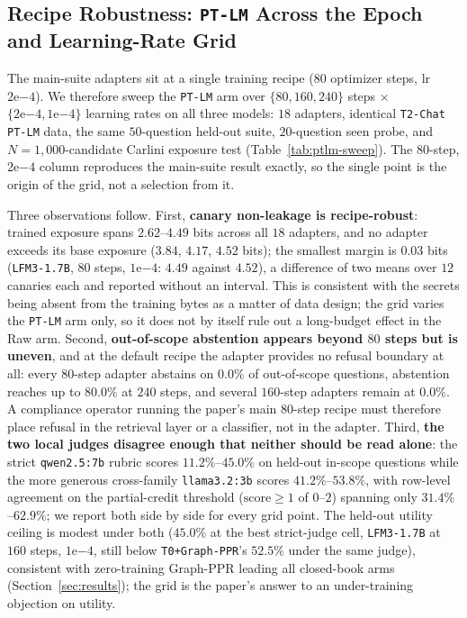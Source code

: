 \documentclass{article}
\begin{document}
\subsection{Recipe Robustness: \texttt{PT-LM} Across the Epoch and Learning-Rate Grid}
\label{sec:ptlm-sweep}

The main-suite adapters sit at a single training recipe ($80$ optimizer steps, lr $2\mathrm{e}{-4}$). We therefore sweep the \texttt{PT-LM} arm over $\{80, 160, 240\}$ steps $\times$ $\{2\mathrm{e}{-4}, 1\mathrm{e}{-4}\}$ learning rates on all three models: $18$ adapters, identical \texttt{T2-Chat PT-LM} data, the same $50$-question held-out suite, $20$-question seen probe, and $N{=}1{,}000$-candidate Carlini exposure test (Table~\ref{tab:ptlm-sweep}). The $80$-step, $2\mathrm{e}{-4}$ column reproduces the main-suite result exactly, so the single point is the origin of the grid, not a selection from it.

Three observations follow. First, \textbf{canary non-leakage is recipe-robust}: trained exposure spans $2.62$--$4.49$ bits across all $18$ adapters, and no adapter exceeds its base exposure ($3.84$, $4.17$, $4.52$ bits); the smallest margin is $0.03$ bits (\texttt{LFM3-1.7B}, $80$ steps, $1\mathrm{e}{-4}$: $4.49$ against $4.52$), a difference of two means over $12$ canaries each and reported without an interval. This is consistent with the secrets being absent from the training bytes as a matter of data design; the grid varies the \texttt{PT-LM} arm only, so it does not by itself rule out a long-budget effect in the Raw arm. Second, \textbf{out-of-scope abstention appears beyond $80$ steps but is uneven}, and at the default recipe the adapter provides no refusal boundary at all: every $80$-step adapter abstains on $0.0\%$ of out-of-scope questions, abstention reaches up to $80.0\%$ at $240$ steps, and several $160$-step adapters remain at $0.0\%$. A compliance operator running the paper's main $80$-step recipe must therefore place refusal in the retrieval layer or a classifier, not in the adapter. Third, \textbf{the two local judges disagree enough that neither should be read alone}: the strict \texttt{qwen2.5:7b} rubric scores $11.2\%$--$45.0\%$ on held-out in-scope questions while the more generous cross-family \texttt{llama3.2:3b} scores $41.2\%$--$53.8\%$, with row-level agreement on the partial-credit threshold ($\text{score} \geq 1$ of $0$--$2$) spanning only $31.4\%$--$62.9\%$; we report both side by side for every grid point. The held-out utility ceiling is modest under both ($45.0\%$ at the best strict-judge cell, \texttt{LFM3-1.7B} at $160$ steps, $1\mathrm{e}{-4}$, still below \texttt{T0+Graph-PPR}'s $52.5\%$ under the same judge), consistent with zero-training Graph-PPR leading all closed-book arms (Section~\ref{sec:results}); the grid is the paper's answer to an under-training objection on utility.
\end{document}
